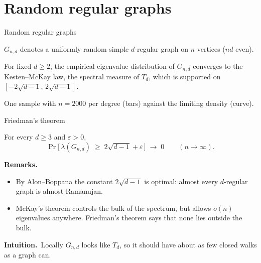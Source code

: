 \documentclass[aspectratio=169,10pt]{beamer}
\newcommand{\edge}{2\sqrt{d-1}}
\newcommand{\eps}{\varepsilon}
\newcommand{\intuition}{{\color{accent}\textbf{Intuition.}}\ }
\begin{document}
\section{Random regular graphs}

\begin{frame}{Random regular graphs}
  \begin{definition}
    $G_{n,d}$ denotes a uniformly random simple $d$-regular graph on $n$ vertices ($nd$ even).
  \end{definition}
  \begin{theorem}[McKay, 1981]
    For fixed $d\ge2$, the empirical eigenvalue distribution of $G_{n,d}$ converges to the
    Kesten--McKay law, the spectral measure of $T_d$, which is supported on $[-\edge,\,\edge]$.
  \end{theorem}
  \vspace{-1mm}
  \centering
  

  \vspace{-1mm}
  {\scriptsize\color{black!60} One sample with $n=2000$ per degree (bars) against the limiting density (curve).}
\end{frame}

\begin{frame}{Friedman's theorem}
  \begin{theorem}
    For every $d\ge3$ and $\eps>0$,
    \[
      \Pr\bigl[\,\lambda(G_{n,d})\;\ge\;\edge+\eps\,\bigr]\;\longrightarrow\;0
      \qquad(n\to\infty).
    \]
    \vspace{-5mm}
  \end{theorem}
  \vspace{1mm}
  \textbf{Remarks.}
  \begin{itemize}
    \item By Alon--Boppana the constant $\edge$ is optimal: almost every $d$-regular graph is almost Ramanujan.
    \item McKay's theorem controls the bulk of the spectrum, but allows $o(n)$ eigenvalues anywhere.
          Friedman's theorem says that \alert{none} lies outside the bulk.
  \end{itemize}
  \intuition Locally $G_{n,d}$ looks like $T_d$, so it should have about as few closed walks as a graph can.
\end{frame}

\end{document}
